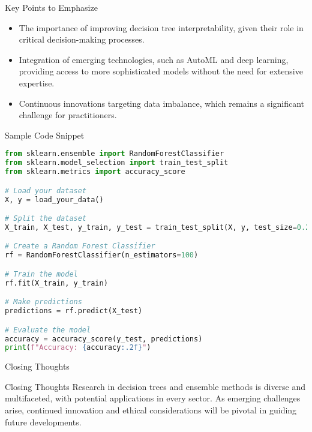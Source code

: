 \documentclass[aspectratio=169]{beamer}
\begin{document}
\begin{frame}[fragile]{Key Points to Emphasize}
    \begin{itemize}
        \item The importance of improving decision tree interpretability, given their role in critical decision-making processes.
        \item Integration of emerging technologies, such as AutoML and deep learning, providing access to more sophisticated models without the need for extensive expertise.
        \item Continuous innovations targeting data imbalance, which remains a significant challenge for practitioners.
    \end{itemize}
\end{frame}

\begin{frame}[fragile]{Sample Code Snippet}
    \begin{lstlisting}[language=Python]
from sklearn.ensemble import RandomForestClassifier
from sklearn.model_selection import train_test_split
from sklearn.metrics import accuracy_score

# Load your dataset
X, y = load_your_data()

# Split the dataset
X_train, X_test, y_train, y_test = train_test_split(X, y, test_size=0.2, random_state=42)

# Create a Random Forest Classifier
rf = RandomForestClassifier(n_estimators=100)

# Train the model
rf.fit(X_train, y_train)

# Make predictions
predictions = rf.predict(X_test)

# Evaluate the model
accuracy = accuracy_score(y_test, predictions)
print(f"Accuracy: {accuracy:.2f}")
    \end{lstlisting}
\end{frame}

\begin{frame}[fragile]{Closing Thoughts}
    \begin{block}{Closing Thoughts}
        Research in decision trees and ensemble methods is diverse and multifaceted, with potential applications in every sector. As emerging challenges arise, continued innovation and ethical considerations will be pivotal in guiding future developments.
    \end{block}
\end{frame}
\end{document}
